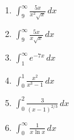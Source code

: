 \documentclass{article}
\begin{document}
\begin{enumerate}
                        \begin{enumerate}
                            \item $ \int_9^\infty \frac{5x}{x^2\sqrt{x}}\,dx$
                            \item $ \int_9^\infty \frac{5x}{x\sqrt{x}}\,dx$
                            \item $ \int_1^\infty e^{-7x}\, dx$
                            \item $ \int_{0}^1 \frac{x^2}{x^3-1}\, dx$
                            \item $ \int_{0}^2 \frac {3}{(x-1)^{2/3}}\, dx$
                            \item $ \int_0^\infty \frac{1}{x\ln{x}}\,dx$
                        \end{enumerate}
                \end{enumerate}
                
\end{document}
